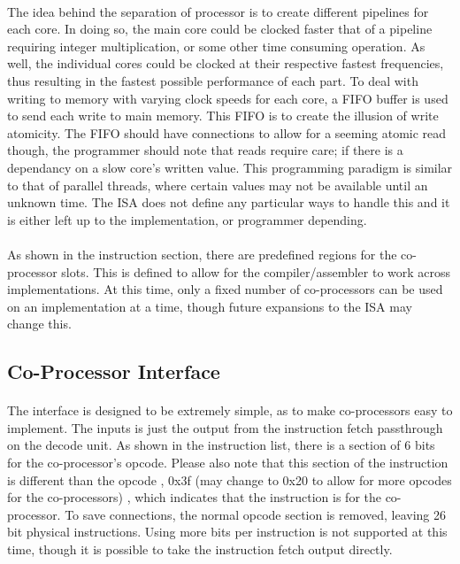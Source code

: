 \documentclass[letterpaper, 11pt]{article}
\begin{document}
\paragraph{}The idea behind the separation of processor is to create different pipelines for each core. In doing so, the main core could be clocked faster that of
a pipeline requiring integer multiplication, or some other time consuming operation. As well, the individual cores could be clocked at their respective 
fastest frequencies, thus resulting in the fastest possible performance of each part. To deal with writing to memory with varying clock speeds for each core,
a FIFO buffer is used to send each write to main memory. This FIFO is to create the illusion of write atomicity. The FIFO should have connections to allow
for a seeming atomic read though, the programmer should note that reads require care; if there is a dependancy on a slow core's written value. This programming 
paradigm is similar to that of parallel threads, where certain values may not be available until an unknown time. The ISA does not define any particular ways
to handle this and it is either left up to the implementation, or programmer depending.
\paragraph{}As shown in the instruction section, there are predefined regions for the co-processor slots. 
This is defined to allow for the compiler/assembler to work across implementations. At this time, only a fixed number of co-processors can be used on 
an implementation at a time, though future expansions to the ISA may change this.  

\subsection{Co-Processor Interface}
\paragraph{}The interface is designed to be extremely simple, as to make co-processors easy to implement. The inputs is just the output from the instruction fetch
passthrough on the decode unit. As shown in the instruction list, there is a section of 6 bits for the co-processor's opcode. Please also note
that this section of the instruction is different than the opcode , 0x3f (may change to 0x20 to allow for more opcodes for the co-processors) , which indicates that the instruction is for the co-processor. To save connections, 
the normal opcode section is removed, leaving 26 bit physical instructions. Using more bits per instruction is not supported at this time, though it is possible
to take the instruction fetch output directly. 
\end{document}
